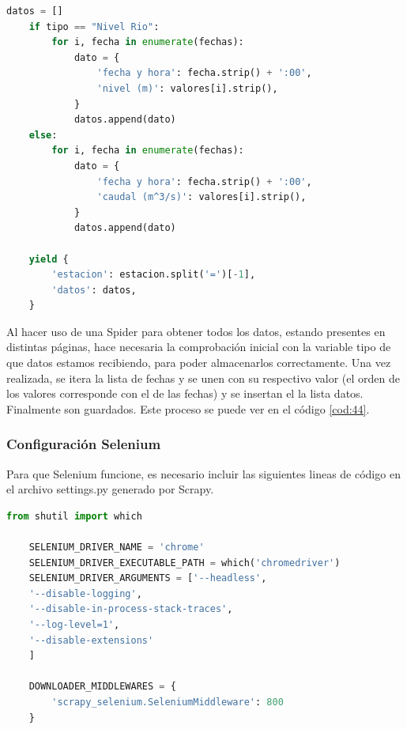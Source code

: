 \begin{lstlisting}[language=Python, caption={Selector en \textit{parse\_data()} de Agua en Navarra Data Spider}, label=cod:44]
	datos = []
	if tipo == "Nivel Rio":
		for i, fecha in enumerate(fechas):
			dato = {
				'fecha y hora': fecha.strip() + ':00',
				'nivel (m)': valores[i].strip(),
			}
			datos.append(dato)
	else:
		for i, fecha in enumerate(fechas):
			dato = {
				'fecha y hora': fecha.strip() + ':00',
				'caudal (m^3/s)': valores[i].strip(),
			}
			datos.append(dato)
	
	yield {
		'estacion': estacion.split('=')[-1],
		'datos': datos,
	}
\end{lstlisting}

Al hacer uso de una Spider para obtener todos los datos, estando presentes en distintas páginas, hace necesaria la comprobación inicial con la variable tipo de que datos estamos recibiendo, para poder almacenarlos correctamente. Una vez realizada, se itera la lista de fechas y se unen con su respectivo valor (el orden de los valores corresponde con el de las fechas) y se insertan el la lista datos. Finalmente son guardados. Este proceso se puede ver en el código \ref{cod:44}.

\subsubsection{Configuración Selenium}
Para que Selenium funcione, es necesario incluir las siguientes lineas de código en el archivo settings.py generado por Scrapy.

\begin{lstlisting}[language=Python, caption={Agua en Navarra configuración Selenium}, label=cod:45]
	from shutil import which
	
	SELENIUM_DRIVER_NAME = 'chrome'
	SELENIUM_DRIVER_EXECUTABLE_PATH = which('chromedriver')
	SELENIUM_DRIVER_ARGUMENTS = ['--headless',
	'--disable-logging',
	'--disable-in-process-stack-traces',
	'--log-level=1',
	'--disable-extensions'
	]
	
	DOWNLOADER_MIDDLEWARES = {
		'scrapy_selenium.SeleniumMiddleware': 800
	}
\end{lstlisting}

